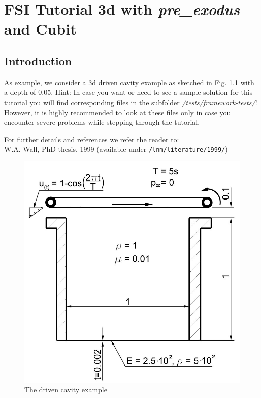 \newcommand{\prexo}{\emph{pre\_exodus \,}}
\newcommand{\bc}{\emph{bc-file \,}}
\newcommand{\head}{\emph{header-file \,}}

\chapter{FSI Tutorial 3d with \prexo and Cubit}
\label{tut_fsi_preexo:chap}

\section{Introduction}

As example, we consider a 3d driven cavity example as
sketched in Fig. \ref{tut_fsi_preexo:1.1} with a depth of 0.05.
Hint: In case you want or need to see a sample solution for this tutorial 
you will find corresponding files in the \baci{} subfolder \emph{/tests/framework-tests/}!
However, it is highly recommended to look at these files only in case you encounter severe problems
while stepping through the tutorial.

For further details and references we refer the reader to:\\
W.A. Wall, PhD thesis, 1999
(available under \texttt{/lnm/literature/1999/})

\newline

\begin{figure}[h]
\hfil\includegraphics[scale=0.2]{Bilder/Angabeskizze}

\caption{\label{tut_fsi_preexo:1.1} The driven cavity example}
\end{figure}

